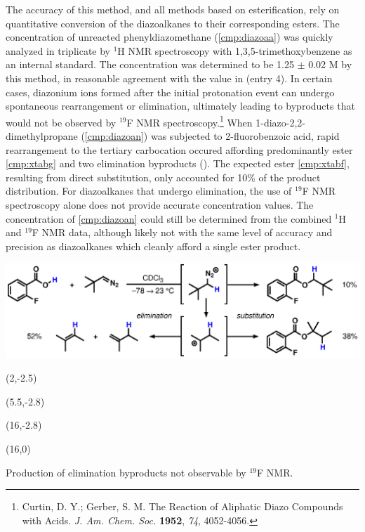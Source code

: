 The accuracy of this method, and all methods based on esterification, rely on
quantitative conversion of the diazoalkanes to their corresponding
esters. The concentration of unreacted phenyldiazomethane (\ref{cmp:diazoaa}) was quickly analyzed
in triplicate by $^1$H NMR spectroscopy with 1,3,5-trimethoxybenzene as an internal standard. The
concentration was determined to be 1.25 $\pm$ 0.02 M by this method, in reasonable agreement with
the value in  (entry 4). In certain cases, diazonium ions formed after the initial protonation event can undergo spontaneous rearrangement or elimination, ultimately leading to byproducts that would not be observed by $^{19}$F NMR spectroscopy.\footnote{{\frenchspacing Curtin, D. Y.; Gerber, S. M. The Reaction of Aliphatic Diazo Compounds with Acids. \textit{J. Am. Chem. Soc.} \textbf{1952}, \textit{74},
4052-4056.}} When 1-diazo-2,2-dimethylpropane (\ref{cmp:diazoan}) was subjected to 2-fluorobenzoic
acid, rapid rearrangement to the tertiary carbocation occured affording predominantly ester
\ref{cmp:xtabg} and two elimination byproducts (). The expected ester
\ref{cmp:xtabf}, resulting from direct substitution, only accounted for 10\% of the product
distribution.
For diazoalkanes that undergo elimination, the use of $^{19}$F NMR spectroscopy alone does not provide accurate concentration values.
The concentration of \ref{cmp:diazoan} could still be determined from the combined $^1$H and
$^{19}$F NMR data, although likely not with the same level of accuracy and
precision as diazoalkanes which cleanly afford a single ester product. 
\begin{Scheme}[t]
  \centering
  \includegraphics[scale=0.8]{chp_asymmetric/images/titrationpiv}
  \begin{textblock}{1}(2,-2.5)  \end{textblock}
  \begin{textblock}{1}(5.5,-2.8)  \end{textblock}
  \begin{textblock}{1}(16,-2.8)  \end{textblock}
  \begin{textblock}{1}(16,0)  \end{textblock}
  \vspace{5pt}
  \caption{Production of elimination byproducts not observable by $^{19}$F NMR.}
  \label{sch:astitrationpiv}
\end{Scheme}  


